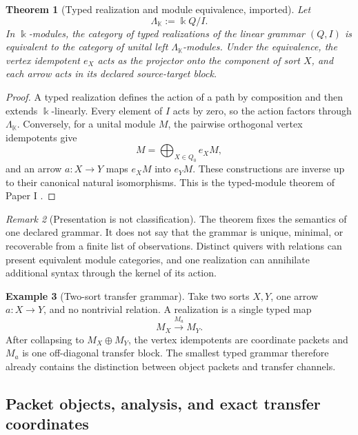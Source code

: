 \documentclass[11pt]{article}
\newtheorem{theorem}{Theorem}[section]
\theoremstyle{definition}
\newtheorem{example}[theorem]{Example}
\theoremstyle{remark}
\newtheorem{remark}[theorem]{Remark}
\newcommand{\kk}{\Bbbk}
\begin{document}
\begin{theorem}[Typed realization and module equivalence, imported]
\label{thm:typed-realization-module-equivalence}
Let
\[
\Lambda_{\mathbb K}:=\kk Q/I.
\]
In \(\kk\)-modules, the category of typed realizations of the linear grammar \((Q,I)\) is equivalent to the category of unital left \(\Lambda_{\mathbb K}\)-modules.  Under the equivalence, the vertex idempotent \(e_X\) acts as the projector onto the component of sort \(X\), and each arrow acts in its declared source-target block.
\end{theorem}

\begin{proof}
A typed realization defines the action of a path by composition and then extends \(\kk\)-linearly.  Every element of \(I\) acts by zero, so the action factors through \(\Lambda_{\mathbb K}\).  Conversely, for a unital module \(M\), the pairwise orthogonal vertex idempotents give
\[
M=\bigoplus_{X\in Q_0}e_XM,
\]
and an arrow \(a:X\to Y\) maps \(e_XM\) into \(e_YM\).  These constructions are inverse up to their canonical natural isomorphisms.  This is the typed-module theorem of Paper I \cite{P1}.
\end{proof}

\begin{remark}[Presentation is not classification]
\label{rem:presentation-not-classification}
The theorem fixes the semantics of one declared grammar.  It does not say that the grammar is unique, minimal, or recoverable from a finite list of observations.  Distinct quivers with relations can present equivalent module categories, and one realization can annihilate additional syntax through the kernel of its action.
\end{remark}

\begin{example}[Two-sort transfer grammar]
\label{ex:two-sort-transfer}
Take two sorts \(X,Y\), one arrow \(a:X\to Y\), and no nontrivial relation.  A realization is a single typed map
\[
M_X\xrightarrow{M_a}M_Y.
\]
After collapsing to \(M_X\oplus M_Y\), the vertex idempotents are coordinate packets and \(M_a\) is one off-diagonal transfer block.  The smallest typed grammar therefore already contains the distinction between object packets and transfer channels.
\end{example}

\subsection{Packet objects, analysis, and exact transfer coordinates}
\label{subsec:packet-coordinate-core}
\end{document}
